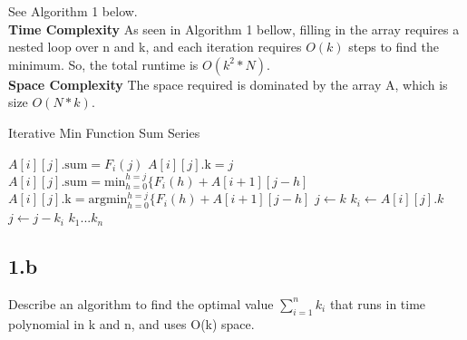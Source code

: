 \documentclass[11pt]{article}
\begin{document}
\begin{solution}
See Algorithm 1 below. \\

\textbf{Time Complexity}
As seen in Algorithm 1 bellow, filling in the array requires a nested loop over n and k, and each iteration requires $O(k)$ steps to find the minimum. So, the total runtime is $O(k^2*N)$. \\
\textbf{Space Complexity}
The space required is dominated by the array A, which is size $O(N*k)$.
\begin{algorithm}
\caption{Iterative Min Function Sum Series}
\begin{algorithmic}
\STATE $A[i][j].\text{sum} = F_i(j)$
\STATE $A[i][j].\text{k} = j$
\ELSE
\STATE $A[i][j].\text{sum} = \text{min}_{h=0}^{h=j} \{ F_i(h) + A[i+1][j-h]$
\STATE $A[i][j].\text{k} = \text{argmin}_{h=0}^{h=j} \{ F_i(h) + A[i+1][j-h]$
\ENDIF
\ENDFOR
\ENDFOR
\STATE $j \gets k$
\STATE $k_i \gets A[i][j].k$
\STATE $j \gets j - k_i$
\ENDFOR
\RETURN $k_1...k_n$
\end{algorithmic}
\end{algorithm} 
\end{solution}

\clearpage



\subsection *{1.b} Describe an algorithm to find the optimal value $\sum_{i=1}^{n} k_i$ that runs in time polynomial in k and n, and uses O(k) space. 
\end{document}
